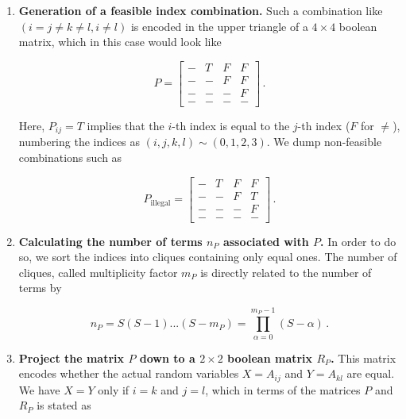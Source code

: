 \documentclass[10pt]{article}
\begin{document}
\begin{enumerate}
    \item \textbf{Generation of a feasible index combination.}
        Such a combination like $(i = j \ne k \ne l, i \ne l)$ is encoded in the upper triangle of a $4 \times 4$ 
        boolean matrix, which in this case would look like  

        \begin{equation}
        P = \begin{bmatrix}
          - & T & F & F\\
          - & - & F & F\\
          - & - & - & F\\
          - & - & - & - 
         \end{bmatrix}  \,.
        \end{equation}
         
        Here, $P_{ij} = T$ implies that the $i$-th index is equal to the $j$-th index ($F$ for $\ne$), numbering
        the indices as $(i, j, k, l) \sim (0, 1, 2, 3)$. We dump non-feasible combinations such as   

        \begin{equation}
        P_\mathrm{illegal} = \begin{bmatrix}
          - & T & F & F\\
          - & - & F & T\\
          - & - & - & F\\
          - & - & - & - 
         \end{bmatrix} \,.
        \end{equation}
     
    \item\textbf{Calculating the number of terms $n_P$ associated with $P$.}
        In order to do so, we sort the indices into cliques containing only equal ones. The number of cliques, called multiplicity factor $m_P$ is directly related to the number of terms by

        \begin{equation}
         n_P = S (S - 1) ... (S - m_P) = \prod_{\alpha = 0}^{m_P - 1} (S - \alpha)   \,.
        \end{equation}

    \item\textbf{Project the matrix $P$ down to a $2 \times 2$ boolean matrix $R_P$.} 
        This matrix encodes whether the actual random variables $X = A_{ij}$ and $Y = A_{kl}$ are equal. 
        We have $X = Y$ only if $i = k$ and $j = l$, which in terms of the matrices $P$ and $R_P$ is
        stated as


\end{enumerate}
\end{document}
